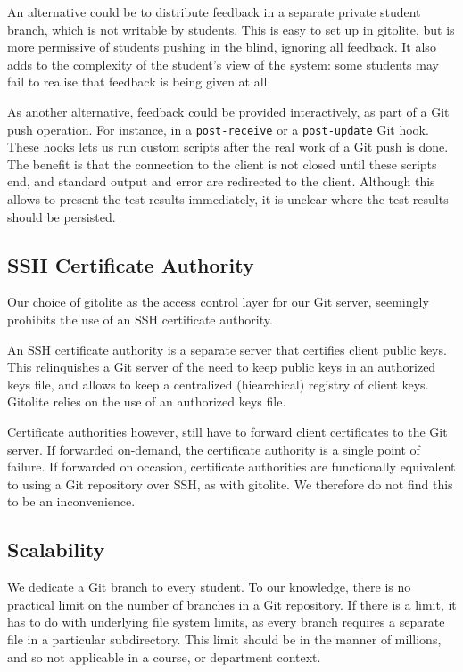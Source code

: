 An alternative could be to distribute feedback in a separate private student
branch, which is not writable by students. This is easy to set up in gitolite,
but is more permissive of students pushing in the blind, ignoring all feedback.
It also adds to the complexity of the student's view of the system: some
students may fail to realise that feedback is being given at all.

As another alternative, feedback could be provided interactively, as part of a
Git push operation. For instance, in a \texttt{post-receive} or a
\texttt{post-update} Git hook. These hooks lets us run custom scripts after the
real work of a Git push is done. The benefit is that the connection to the
client is not closed until these scripts end, and standard output and error are
redirected to the client\cite{man-5-githooks}. Although this allows to present
the test results immediately, it is unclear where the test results should be
persisted.

\subsection{SSH Certificate Authority}

\label{section:gitolite-ssh-certificate-authority}

Our choice of gitolite as the access control layer for our Git server,
seemingly prohibits the use of an SSH certificate authority.

An SSH certificate authority is a separate server that certifies client public
keys.  This relinquishes a Git server of the need to keep public keys in an
authorized keys file, and allows to keep a centralized (hiearchical) registry
of client keys. Gitolite relies on the use of an authorized keys file.

Certificate authorities however, still have to forward client certificates to
the Git server. If forwarded on-demand, the certificate authority is a single
point of failure. If forwarded on occasion, certificate authorities are
functionally equivalent to using a Git repository over SSH, as with gitolite.
We therefore do not find this to be an inconvenience.

\subsection{Scalability}

\label{section:git-server-scalability}

We dedicate a Git branch to every student. To our knowledge, there is no
practical limit on the number of branches in a Git repository. If there is a
limit, it has to do with underlying file system limits, as every branch
requires a separate file in a particular subdirectory. This limit should be in
the manner of millions, and so not applicable in a course, or department
context.

